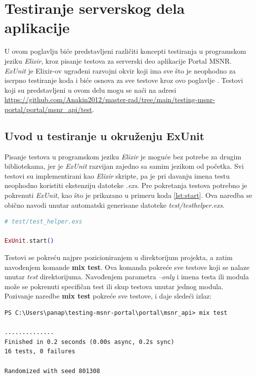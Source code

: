 \documentclass[12pt,oneside]{memoir}
\begin{document}
\chapter{Testiranje serverskog dela aplikacije}
\label{chp:elixir}

\par U ovom poglavlju biće predstavljeni različiti koncepti testiranja u programskom jeziku \emph{Elixir}, kroz pisanje testova za serverski deo aplikacije Portal MSNR. \textit{ExUnit} je Elixir-ov ugrađeni razvojni okvir koji ima sve što je neophodno za iscrpno testiranje koda i biće osnova za sve testove kroz ovo poglavlje \cite{exunit}. Testovi koji su predstavljeni u ovom delu mogu se naći na adresi \url{https://github.com/Anakin2012/master-rad/tree/main/testing-msnr-portal/portal/msnr_api/test}.

\section{Uvod u testiranje u okruženju ExUnit}
\label{sec:elixunit}

\par Pisanje testova u programskom jeziku \emph{Elixir} je moguće bez potrebe za drugim bibliotekama, jer je \emph{ExUnit} razvijan zajedno sa samim jezikom od početka. Svi testovi su implementirani kao \emph{Elixir} skripte, pa je pri davanju imena testu neophodno koristiti ekstenziju datoteke \emph{.exs}. Pre pokretanja testova potrebno je pokrenuti \emph{ExUnit}, kao što je prikazano u primeru koda \ref{lst:start}. Ova naredba se obično navodi unutar automatski generisane datoteke \emph{test/test{\textunderscore}helper.exs}. 

\begin{lstlisting}[language=elixir, caption={Pokretanje ExUnit},captionpos=b, label={lst:start}]
# test/test_helper.exs

ExUnit.start()
\end{lstlisting}

\par Testovi se pokreću najpre pozicioniranjem u direktorijum projekta, a zatim navođenjem komande \textbf{mix test}. Ova komanda pokreće sve testove koji se nalaze unutar \emph{test} direktorijuma. Navođenjem parametra \emph{--only} i imena testa ili modula može se pokrenuti specifičan test ili skup testova unutar jednog modula. Pozivanje naredbe \textbf{mix test } pokreće sve testove, i daje sledeći izlaz:  

\begin{lstlisting}[style=DOS]
PS C:\Users\panap\testing-msnr-portal\portal\msnr_api> mix test

..............
Finished in 0.2 seconds (0.00s async, 0.2s sync)
16 tests, 0 failures

Randomized with seed 801308
\end{lstlisting}
\end{document}
